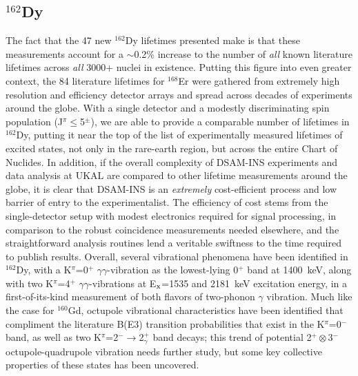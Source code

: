 \subsection{$^{162}$Dy}
The fact that the 47 new $^{162}$Dy lifetimes presented make is that these measurements account for a $\sim$0.2\% increase to the number of \textit{all} known literature lifetimes across \textit{all} 3000+ nuclei in existence. Putting this figure into even greater context, the 84 literature lifetimes for $^{168}$Er were gathered from extremely high resolution and efficiency detector arrays and spread across decades of experiments around the globe. With a single detector and a modestly discriminating spin population (J$^\pi\leq$5$^\pm$), we are able to provide a comparable number of lifetimes in $^{162}$Dy, putting it near the top of the list of experimentally measured lifetimes of excited states, not only in the rare-earth region, but across the entire Chart of Nuclides. In addition, if the overall complexity of DSAM-INS experiments and data analysis at UKAL are compared to other lifetime measurements around the globe, it is clear that DSAM-INS is an \textit{extremely} cost-efficient process and low barrier of entry to the experimentalist. The efficiency of cost stems from the single-detector setup with modest electronics required for signal processing, in comparison to the robust coincidence measurements needed elsewhere, and the straightforward analysis routines lend a veritable swiftness to the time required to publish results. Overall, several vibrational phenomena have been identified in $^{162}$Dy, with a K$^\pi$=0$^+$ $\gamma\gamma$-vibration as the lowest-lying 0$^+$ band at 1400~keV, along with two K$^\pi$=4$^+$ $\gamma\gamma$-vibrations at E$_{\rm x}$=1535 and 2181~keV excitation energy, in a first-of-its-kind measurement of both flavors of two-phonon $\gamma$ vibration. Much like the case for $^{160}$Gd, octupole vibrational characteristics have been identified that compliment the literature B(E3) transition probabilities that exist in the K$^\pi$=0$^-$ band, as well as two K$^\pi$=2$^-\rightarrow$2$^+_\gamma$ band decays; this trend of potential 2$^+\otimes$3$^-$ octupole-quadrupole vibration needs further study, but some key collective properties of these states has been uncovered.
